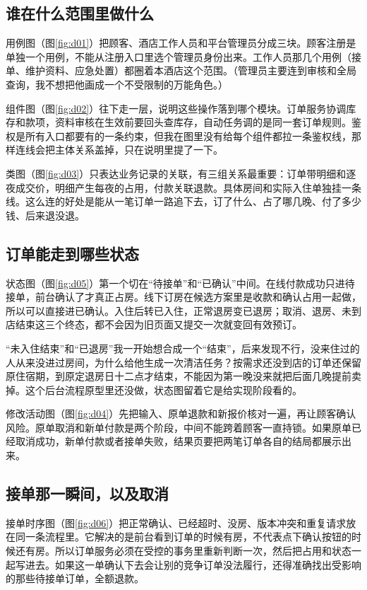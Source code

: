 \documentclass[UTF8,a4paper,zihao=-4,fontset=none]{ctexart}
\begin{document}
\subsection{谁在什么范围里做什么}
用例图（图\ref{fig:d01}）把顾客、酒店工作人员和平台管理员分成三块。顾客注册是单独一个用例，不能从注册入口里选个管理员身份出来。工作人员那几个用例（接单、维护资料、应急处置）都圈着本酒店这个范围。（管理员主要连到审核和全局查询，我不想把他画成一个不受限制的万能角色。）

组件图（图\ref{fig:d02}）往下走一层，说明这些操作落到哪个模块。订单服务协调库存和款项，资料审核在生效前要回头查库存，自动任务调的是同一套订单规则。鉴权是所有入口都要有的一条约束，但我在图里没有给每个组件都拉一条鉴权线，那样连线会把主体关系盖掉，只在说明里提了一下。

类图（图\ref{fig:d03}）只表达业务记录的关联，有三组关系最重要：订单带明细和逐夜成交价，明细产生每夜的占用，付款关联退款。具体房间和实际入住单独挂一条线。这么连的好处是能从一笔订单一路追下去，订了什么、占了哪几晚、付了多少钱、后来退没退。

\subsection{订单能走到哪些状态}
状态图（图\ref{fig:d05}）第一个切在“待接单”和“已确认”中间。在线付款成功只进待接单，前台确认了才真正占房。线下订房在候选方案里是收款和确认占用一起做，所以可以直接进已确认。入住后转已入住，正常退房变已退房；取消、退房、未到店结束这三个终态，都不会因为旧页面又提交一次就变回有效预订。

“未入住结束”和“已退房”我一开始想合成一个“结束”，后来发现不行，没来住过的人从来没进过房间，为什么给他生成一次清洁任务？按需求还没到店的订单还保留原住宿期，到原定退房日十二点才结束，不能因为第一晚没来就把后面几晚提前卖掉。这个后台流程原型里还没做，状态图留着它是给实现阶段看的。

修改活动图（图\ref{fig:d04}）先把输入、原单退款和新报价核对一遍，再让顾客确认风险。原单取消和新单付款是两个阶段，中间不能跨着顾客一直持锁。如果原单已经取消成功，新单付款或者接单失败，结果页要把两笔订单各自的结局都展示出来。

\subsection{接单那一瞬间，以及取消}
接单时序图（图\ref{fig:d06}）把正常确认、已经超时、没房、版本冲突和重复请求放在同一条流程里。它解决的是前台看到订单的时候有房，不代表点下确认按钮的时候还有房。所以订单服务必须在受控的事务里重新判断一次，然后把占用和状态一起写进去。如果这一单确认下去会让别的竞争订单没法履行，还得准确找出受影响的那些待接单订单，全额退款。
\end{document}
